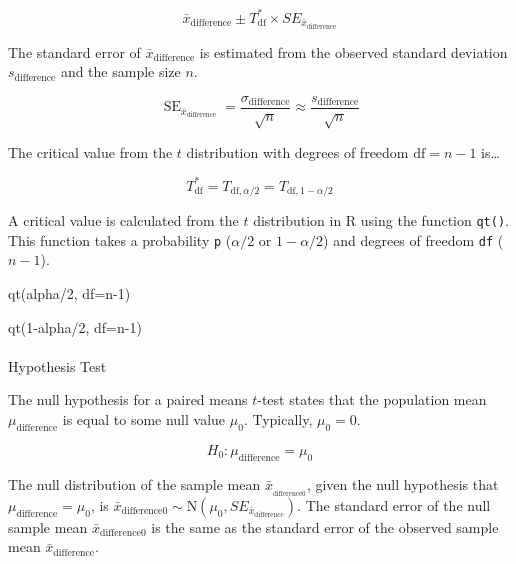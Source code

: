 \documentclass[
  letterpaper,
  DIV=11,
  numbers=noendperiod]{scrartcl}
\makeatletter
\let\oldparagraph\paragraph
\renewcommand{\paragraph}{
    \@ifstar
      \xxxParagraphStar
      \xxxParagraphNoStar
  }
\newcommand{\xxxParagraphStar}[1]{\oldparagraph*{#1}\mbox{}}
\newcommand{\xxxParagraphNoStar}[1]{\oldparagraph{#1}\mbox{}}
\newenvironment{Shaded}{\begin{snugshade}}{\end{snugshade}}
\newcommand{\AttributeTok}[1]{\textcolor[rgb]{0.40,0.45,0.13}{#1}}
\newcommand{\DecValTok}[1]{\textcolor[rgb]{0.68,0.00,0.00}{#1}}
\newcommand{\FunctionTok}[1]{\textcolor[rgb]{0.28,0.35,0.67}{#1}}
\newcommand{\NormalTok}[1]{\textcolor[rgb]{0.00,0.23,0.31}{#1}}
\newcommand{\SpecialCharTok}[1]{\textcolor[rgb]{0.37,0.37,0.37}{#1}}
\makeatother
\begin{document}
\[
\bar{x}_{\text{difference}} \pm T_{\text{df}}^* \times SE_{\bar{x}_{\text{difference}}}
\]

The standard error of \(\bar{x}_{\text{difference}}\) is estimated from
the observed standard deviation \(s_{\text{difference}}\) and the sample
size \(n\).

\[
\operatorname{SE}_{\bar{x}_{\text{difference}}}=\frac{\sigma_{\text{difference}}}{\sqrt{n}}\approx\frac{s_{\text{difference}}}{\sqrt{n}}
\]

The critical value from the \(t\) distribution with degrees of freedom
\(\text{df}=n-1\) is\ldots{}

\[
T_{\text{df}}^*=T_{\text{df},\alpha/2}=T_{\text{df}, 1-\alpha/2}
\]

A critical value is calculated from the \(t\) distribution in R using
the function \texttt{qt()}. This function takes a probability \texttt{p}
(\(\alpha/2\) or \(1-\alpha/2\)) and degrees of freedom \texttt{df}
(\(n-1\)).

\begin{Shaded}
\begin{Highlighting}[]
\FunctionTok{qt}\NormalTok{(alpha}\SpecialCharTok{/}\DecValTok{2}\NormalTok{, }\AttributeTok{df=}\NormalTok{n}\DecValTok{{-}1}\NormalTok{)}

\FunctionTok{qt}\NormalTok{(}\DecValTok{1}\SpecialCharTok{{-}}\NormalTok{alpha}\SpecialCharTok{/}\DecValTok{2}\NormalTok{, }\AttributeTok{df=}\NormalTok{n}\DecValTok{{-}1}\NormalTok{)}
\end{Highlighting}
\end{Shaded}

\paragraph{Hypothesis Test}\label{hypothesis-test-1}

The null hypothesis for a paired means \(t\)-test states that the
population mean \(\mu_{\text{difference}}\) is equal to some null value
\(\mu_0\). Typically, \(\mu_0=0\).

\[
H_0 \colon \mu_{\text{difference}}=\mu_0
\]

The null distribution of the sample mean
\(\bar{x}__{\text{difference}0}\), given the null hypothesis that
\(\mu_{\text{difference}}=\mu_0\), is
\(\bar{x}_{\text{difference}0} \sim \text{N}\left(\mu_0, SE_{\bar{x}_{\text{difference}}}\right)\).
The standard error of the null sample mean
\(\bar{x}_{\text{difference}0}\) is the same as the standard error of
the observed sample mean \(\bar{x}_{\text{difference}}\).
\end{document}
